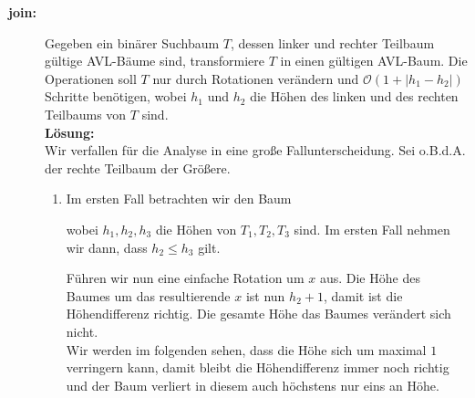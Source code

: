 \documentclass[11pt,a4paper,ngerman]{article}
\begin{document}
\begin{description}

\item[\bfseries join:] Gegeben ein binärer Suchbaum $T$, dessen linker und rechter Teilbaum gültige AVL-Bäume sind, transformiere $T$ in einen gültigen AVL-Baum. Die Operationen soll $T$ nur durch Rotationen verändern und $\mathcal{O}(1 + | h_1 - h_2|)$ Schritte benötigen, wobei $h_1$ und $h_2$ die Höhen des linken und des rechten Teilbaums von $T$ sind.\\

\noindent\textbf{Lösung:}\\

Wir verfallen für die Analyse in eine große Fallunterscheidung. Sei o.B.d.A. der rechte Teilbaum der Größere.

\begin{enumerate}[1. {Fall:}]
   \item Im ersten Fall betrachten wir den Baum 
      \begin{center}
      \end{center}
      wobei $h_1, h_2, h_3$ die Höhen von $T_1, T_2, T_3$ sind. Im ersten Fall nehmen wir dann, dass $h_2 \leq h_3$ gilt.
      
      Führen wir nun eine einfache Rotation um $x$ aus. Die Höhe des Baumes um das resultierende $x$ ist nun $h_2 + 1$, damit ist die Höhendifferenz richtig.
      Die gesamte Höhe das Baumes verändert sich nicht.\\

      Wir werden im folgenden sehen, dass die Höhe sich um maximal $1$ verringern kann, damit bleibt die Höhendifferenz immer noch richtig und der Baum verliert in diesem auch 
      höchstens nur eins an Höhe.\\


\end{enumerate}
\end{description}
\end{document}
